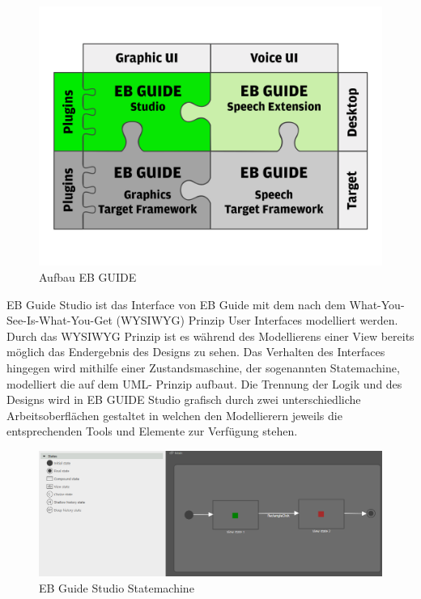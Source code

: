 \begin{figure} [!h]
\begin{center}
  \includegraphics[scale=0.7]{figures/EB_GUIDE_Puzzle.png}
  \caption{Aufbau EB GUIDE}
  \label{fig:guide_puzzle}
\end{center}
\end{figure}

EB Guide Studio ist das Interface von EB Guide mit dem nach dem What-You-See-Is-What-You-Get (WYSIWYG) Prinzip User Interfaces modelliert werden. 
Durch das WYSIWYG Prinzip ist es während des Modellierens einer View bereits möglich das Endergebnis des Designs zu sehen.
Das Verhalten des Interfaces hingegen wird mithilfe einer Zustandsmaschine, der sogenannten Statemachine, modelliert die auf dem UML- Prinzip aufbaut.
Die Trennung der Logik und des Designs wird in EB GUIDE Studio grafisch durch zwei unterschiedliche Arbeitsoberflächen gestaltet in welchen den Modellierern jeweils die entsprechenden Tools und Elemente zur Verfügung stehen.

\begin{figure} [!h]
\begin{center}
  \includegraphics[scale=0.4]{figures/Guide_Statemachine.PNG}
  \caption{EB Guide Studio Statemachine}
  \label{fig:Guide_Statemachine}
\end{center}
\end{figure}

